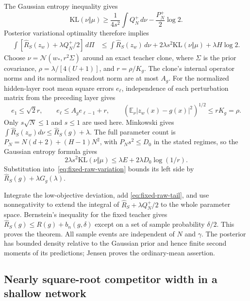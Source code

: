 The Gaussian entropy inequality gives
\[
 \mathrm{KL}(\nu\Vert\mu)
   \geq\frac1{4s^2}\int Q_N^+\,d\nu-\frac{P_N^+}2\log2.
\]
Posterior variational optimality therefore implies
\begin{align}
 \int[\widehat R_S(z_w)+\lambda Q_N^+/2]\,d\Pi
 &\leq\int\widehat R_S(z_w)\,d\nu
       +2\lambda s^2\mathrm{KL}(\nu\Vert\mu)
       +\lambda H\log2.
 \label{eq:fixed-raw-variation}
\end{align}
Choose $\nu=\mathcal N(w_*,r^2\Sigma)$ around an exact teacher clone,
where $\Sigma$ is the prior covariance,
$\rho=\lambda/[4(U+1)]$, and $r=\rho/K_g$.  The clone's internal
operator norms and its normalized readout norm are at most $A_g$.
For the normalized hidden-layer root mean square errors $e_\ell$,
independence of each perturbation matrix from the preceding layer gives
\[
 e_1\leq\sqrt2r,\qquad
 e_\ell\leq A_ge_{\ell-1}+r,
 \qquad
 (\mathbb E_\nu|z_w(x)-g(x)|^2)^{1/2}\leq rK_g=\rho.
\]
Only $s\sqrt N\leq1$ and $s\leq1$ are used here.  Minkowski gives
$\int\widehat R_S(z_w)d\nu\leq\widehat R_S(g)+\lambda$.
The full parameter count is $P_N=N(d+2)+(H-1)N^2$, with
$P_Ns^2\leq D_0$ in the stated regimes, so the Gaussian entropy formula
gives
\[
 2\lambda s^2\mathrm{KL}(\nu\Vert\mu)
   \leq\lambda E+2\lambda D_0\log(1/r).
\]
Substitution into~\eqref{eq:fixed-raw-variation} bounds its left side
by $\widehat R_S(g)+\lambda G_g(\lambda)$.

Integrate the low-objective deviation, add
\eqref{eq:fixed-raw-tail}, and use nonnegativity to extend the integral
of $\widehat R_S+\lambda Q_N^+/2$ to the whole parameter space.
Bernstein's inequality for the fixed teacher gives
$\widehat R_S(g)\leq R(g)+b_n(g,\delta)$ except on a set of sample
probability $\delta/2$.  This proves the theorem.  All sample events are
independent of $N$ and $\gamma$.  The posterior has bounded density
relative to the Gaussian prior and hence finite second moments of its
predictions; Jensen proves the ordinary-mean assertion.

\subsection{Nearly square-root competitor width in a shallow network}

